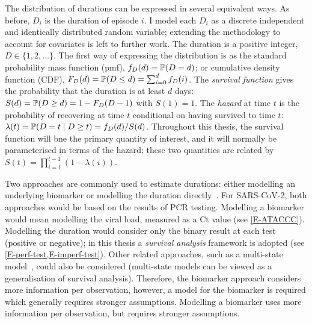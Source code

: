 \documentclass[thesis.tex]{subfiles}
\begin{document}
The distribution of durations can be expressed in several equivalent ways.
As before, $D_i$ is the duration of episode $i$.
I model each $D_i$ as a discrete independent and identically distributed random variable; extending the methodology to account for covariates is left to further work.
The duration is a positive integer, \ie $D \in \{1, 2, \dots\}$.
The first way of expressing the distribution is as the standard probability mass function (pmf), $f_{D}(d) = \operatorname{\mathbb{P}}(D = d)$; or cumulative density function (CDF), $F_{D}(d) = \operatorname{\mathbb{P}}(D \leq d) = \sum_{i=0}^d f_{D}(i)$.
The \emph{survival function} gives the probability that the duration is at least $d$ days: $S(d) = \operatorname{\mathbb{P}}(D \geq d) = 1 - F_{D}(D - 1)$ with $S(1) = 1$.
The \emph{hazard} at time $t$ is the probability of recovering at time $t$ conditional on having survived to time $t$: $\lambda(t) = \operatorname{\mathbb{P}}(D = t \mid D \geq t) = f_{D}(d) / S(d)$.
Throughout this thesis, the survival function will bne the primary quantity of interest, and it will normally be parameterised in terms of the hazard; these two quantities are related by $S(t) = \prod_{i=1}^{t-1} (1 - \lambda(i))$.

Two approaches are commonly used to estimate durations: either modelling an underlying biomarker or modelling the duration directly~\autocite{sweetingEstimating}.
For SARS-CoV-2, both approaches would be based on the results of PCR testing.
Modelling a biomarker would mean modelling the viral load, measured as a Ct value (see \cref{E-ATACCC}).
Modelling the duration would consider only the binary result at each test (positive or negative); in this thesis a \emph{survival analysis} framework is adopted (see \cref{E-perf-test,E-imperf-test}).
Other related approaches, such as a multi-state model~\autocite{jacksonMSM}, could also be considered (multi-state models can be viewed as a generalisation of survival analysis).
Therefore, the biomarker approach considers more information per observation, however, a model for the biomarker is required which generally requires stronger assumptions.
Modelling a biomarker uses more information per observation, but requires stronger assumptions.

\end{document}

